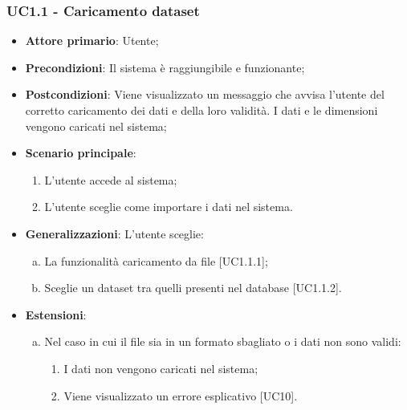\subsubsection{UC1.1 - Caricamento dataset}

\begin{itemize}
	\item \textbf{Attore primario}: Utente;
	\item \textbf{Precondizioni}: Il sistema è raggiungibile e funzionante;
	\item \textbf{Postcondizioni}: Viene visualizzato un messaggio che avvisa l'utente del corretto caricamento dei dati e della loro validità. I dati e le dimensioni vengono caricati nel sistema;
	\item \textbf{Scenario principale}:
		\begin{enumerate}
			\item L'utente accede al sistema;
			\item L'utente sceglie come importare i dati nel sistema.
			
		\end{enumerate}
		
	\item \textbf{Generalizzazioni}: L'utente sceglie:
	\begin{enumerate}[(a)]
			\item La funzionalità caricamento da file [UC1.1.1];
			\item Sceglie un dataset tra quelli presenti nel database [UC1.1.2].
			\end{enumerate}
	
	\item \textbf{Estensioni}:
	\begin{enumerate}[(a)]
		\item Nel caso in cui il file sia in un formato sbagliato o i dati non sono validi:
		\begin{enumerate}[1.]
			\item I dati non vengono caricati nel sistema;
			\item Viene visualizzato un errore esplicativo [UC10].
		\end{enumerate}
	\end{enumerate}
\end{itemize}

